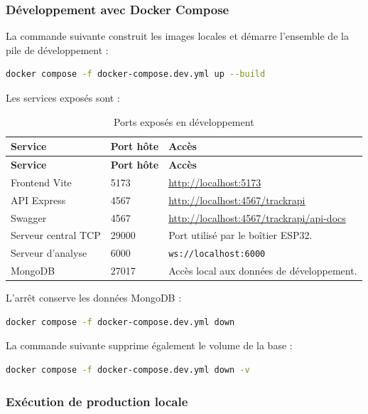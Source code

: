 \documentclass[11pt,a4paper]{article}
\newcommand{\code}[1]{\nolinkurl{#1}}
\begin{document}
\subsubsection{Développement avec Docker Compose}

La commande suivante construit les images locales et démarre l'ensemble de la pile de développement :

\begin{lstlisting}[language=bash]
docker compose -f docker-compose.dev.yml up --build
\end{lstlisting}

Les services exposés sont :

\begin{longtable}{L{4.4cm}L{3.0cm}L{8.6cm}}
\caption{Ports exposés en développement}\label{tab:ports-dev}\\
\toprule
\textbf{Service} & \textbf{Port hôte} & \textbf{Accès} \\
\midrule
\endfirsthead
\toprule
\textbf{Service} & \textbf{Port hôte} & \textbf{Accès} \\
\midrule
\endhead
Frontend Vite & 5173 & \url{http://localhost:5173} \\
API Express & 4567 & \url{http://localhost:4567/trackrapi} \\
Swagger & 4567 & \url{http://localhost:4567/trackrapi/api-docs} \\
Serveur central TCP & 29000 & Port utilisé par le boîtier ESP32. \\
Serveur d'analyse & 6000 & \code{ws://localhost:6000} \\
MongoDB & 27017 & Accès local aux données de développement. \\
\bottomrule
\end{longtable}

L'arrêt conserve les données MongoDB :

\begin{lstlisting}[language=bash]
docker compose -f docker-compose.dev.yml down
\end{lstlisting}

La commande suivante supprime également le volume de la base :

\begin{lstlisting}[language=bash]
docker compose -f docker-compose.dev.yml down -v
\end{lstlisting}

\subsubsection{Exécution de production locale}
\end{document}
